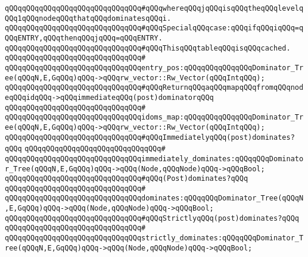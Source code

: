 \verb|qQQqqQQqqQQqqQQqqQQqqQQqqQQqqQQq#qQQqwhereqQQqjqQQqisqQQqtheqQQqlevelqQQq1qQQqnodeqQQqthatqQQqdominatesqQQqi.|\newline
\verb|qQQqqQQqqQQqqQQqqQQqqQQqqQQqqQQq#qQQqSpecialqQQqcase:qQQqifqQQqiqQQq=qQQqENTRY,qQQqthenqQQqjqQQq=qQQqENTRY.|\newline
\verb|qQQqqQQqqQQqqQQqqQQqqQQqqQQqqQQq#qQQqThisqQQqtableqQQqisqQQqcached.|\newline
\verb|qQQqqQQqqQQqqQQqqQQqqQQqqQQqqQQq#|\newline
\verb|qQQqqQQqqQQqqQQqqQQqqQQqqQQqqQQqentry_pos:qQQqqQQqqQQqqQQqDominator_Tree(qQQqN,E,GqQQq)qQQq->qQQqrw_vector::Rw_Vector(qQQqIntqQQq);|\newline
\newline
\newline
\verb|qQQqqQQqqQQqqQQqqQQqqQQqqQQqqQQq#qQQqReturnqQQqaqQQqmapqQQqfromqQQqnodeqQQqidqQQq->qQQqimmediateqQQq(post)dominatorqQQq|\newline
\verb|qQQqqQQqqQQqqQQqqQQqqQQqqQQqqQQq#|\newline
\verb|qQQqqQQqqQQqqQQqqQQqqQQqqQQqqQQqidoms_map:qQQqqQQqqQQqqQQqDominator_Tree(qQQqN,E,GqQQq)qQQq->qQQqrw_vector::Rw_Vector(qQQqIntqQQq);|\newline
\newline
\newline
\verb|qQQqqQQqqQQqqQQqqQQqqQQqqQQqqQQq#qQQqImmediatelyqQQq(post)dominates?qQQq|\newline
\verb|qQQqqQQqqQQqqQQqqQQqqQQqqQQqqQQq#|\newline
\verb|qQQqqQQqqQQqqQQqqQQqqQQqqQQqqQQqimmediately_dominates:qQQqqQQqDominator_Tree(qQQqN,E,GqQQq)qQQq->qQQq(Node,qQQqNode)qQQq->qQQqBool;|\newline
\newline
\newline
\verb|qQQqqQQqqQQqqQQqqQQqqQQqqQQqqQQq#qQQq(Post)dominates?qQQq|\newline
\verb|qQQqqQQqqQQqqQQqqQQqqQQqqQQqqQQq#|\newline
\verb|qQQqqQQqqQQqqQQqqQQqqQQqqQQqqQQqdominates:qQQqqQQqDominator_Tree(qQQqN,E,GqQQq)qQQq->qQQq(Node,qQQqNode)qQQq->qQQqBool;|\newline
\newline
\newline
\verb|qQQqqQQqqQQqqQQqqQQqqQQqqQQqqQQq#qQQqStrictlyqQQq(post)dominates?qQQq|\newline
\verb|qQQqqQQqqQQqqQQqqQQqqQQqqQQqqQQq#|\newline
\verb|qQQqqQQqqQQqqQQqqQQqqQQqqQQqqQQqstrictly_dominates:qQQqqQQqDominator_Tree(qQQqN,E,GqQQq)qQQq->qQQq(Node,qQQqNode)qQQq->qQQqBool;|\newline
